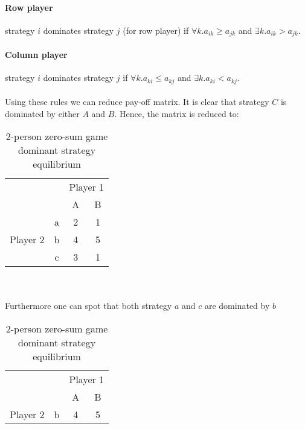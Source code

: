 \documentclass[10pt, a4paper]{report}
\begin{document}
\paragraph{Row player} strategy $i$ dominates strategy $j$ (for row player) if $\forall k. a_{ik} \ge a_{jk}$ and $\exists k.a_{ik} > a_{jk}$.
\paragraph{Column player} strategy $i$ dominates strategy $j$ if $\forall k. a_{ki} \le a_{kj}$ and $\exists k.a_{ki} < a_{kj}$.
\\\\
Using these rules we can reduce pay-off matrix. It is clear that strategy $C$ is dominated by either $A$ and $B$. Hence, the matrix is reduced to:
\begin{table}[ht!]
	\hspace{-4em}
	\centering
	\begin{tabular}{cccc|}
		& & \multicolumn{2}{c}{Player 1}                            \\ \cline{3-4}
		& & A & \multicolumn{1}{c}{B}                               \\ \cline{3-4}
		\multirow{3}{*}{Player 2} & \multicolumn{1}{|c|}{a} & 2 & 1 \\
		& \multicolumn{1}{|c|}{b} & 4 & 5                           \\
		& \multicolumn{1}{|c|}{c} & 3 & 1                           \\ \cline{3-4}
	\end{tabular}
	\caption{2-person zero-sum game\\ dominant strategy equilibrium}
\end{table}
\\\\
Furthermore one can spot that both strategy $a$ and $c$ are dominated by $b$
\begin{table}[ht!]
	\hspace{-4em}
	\centering
	\begin{tabular}{cccc|}
		& & \multicolumn{2}{c}{Player 1}           \\ \cline{3-4}
		& & A & \multicolumn{1}{c}{B}              \\ \cline{3-4}
		Player 2 & \multicolumn{1}{|c|}{b} & 4 & 5 \\ \cline{3-4}
	\end{tabular}
	\caption{2-person zero-sum game\\ dominant strategy equilibrium}
\end{table}
\end{document}
